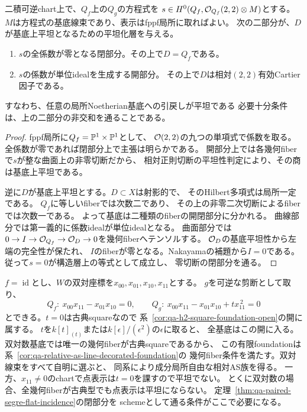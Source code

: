 \begin{theorem}[古典点を含む点表示の平坦化]
\label{thm:qa-paired-segre-flat-incidence}
二積可逆chart上で、$Q_f$上の$Q_g$の方程式を
$s\in H^0(Q_f,\mathcal O_{Q_f}(2,2)\otimes M)$とする。
$M$は方程式の基底線束であり、表示はfppf局所に取ればよい。
次の二部分が、$D$が基底上平坦となるための平坦化層を与える。
\begin{enumerate}
\item $s$の全係数が零となる閉部分。その上で$D=Q_f$である。
\item $s$の係数が単位idealを生成する開部分。
その上で$D$は相対$(2,2)$有効Cartier因子である。
\end{enumerate}
すなわち、任意の局所Noetherian基底への引戻しが平坦である
必要十分条件は、上の二部分の非交和を通ることである。
\end{theorem}
\begin{proof}
fppf局所に$Q_f=\mathbb P^1\times\mathbb P^1$として、
$\mathcal O(2,2)$の九つの単項式で係数を取る。
全係数が零であれば閉部分上で主張は明らかである。
開部分上では各幾何fiberで$s$が整な曲面上の非零切断だから、
相対正則切断の平坦性判定により、その商は基底上平坦である。

逆に$D$が基底上平坦とする。$D\subset X$は射影的で、
そのHilbert多項式は局所一定である。
$Q_f$に等しいfiberでは次数二であり、
その上の非零二次切断によるfiberでは次数一である。
よって基底は二種類のfiberの開閉部分に分かれる。
曲線部分では第一義的に係数idealが単位idealとなる。
曲面部分では
$0\to I\to\mathcal O_{Q_f}\to\mathcal O_D\to0$を幾何fiberへテンソルする。
$\mathcal O_D$の基底平坦性から左端の完全性が保たれ、
$I$のfiberが零となる。Nakayamaの補題から$I=0$である。
従って$s=0$が構造層上の等式として成立し、
零切断の閉部分を通る。
\end{proof}

\begin{example}[平坦AS族の点表示が平坦でない場合]
$f=\operatorname{id}$とし、$W$の双対座標を$x_{00},x_{01},x_{10},x_{11}$とする。
$g$を可逆な剪断として取り、
\[
 Q_f:\ x_{00}x_{11}-x_{01}x_{10}=0,\qquad
 Q_g:\ x_{00}x_{11}-x_{01}x_{10}+t x_{11}^{\,2}=0
\]
とできる。$t=0$は古典squareなので
系~\ref{cor:qa-h2-square-foundation-open}の開に属する。
$t$を$k[t]_{(t)}$または$k[\epsilon]/(\epsilon^2)$の$\epsilon$に取ると、
全基底はこの開に入る。
双対数基底では唯一の幾何fiberが古典squareであるから、
この有限foundationは系~\ref{cor:qa-relative-as-line-decorated-foundation}の
幾何fiber条件を満たす。双対線束をすべて自明に選ぶと、
同系により成分局所自由な相対AS族を得る。
一方、$x_{11}\ne0$のchartで点表示は$t=0$を課すので平坦でない。
とくに双対数の場合、全幾何fiberが古典型でも点表示は平坦にならない。
定理~\ref{thm:qa-paired-segre-flat-incidence}の閉部分を
schemeとして通る条件がここで必要になる。
\end{example}

